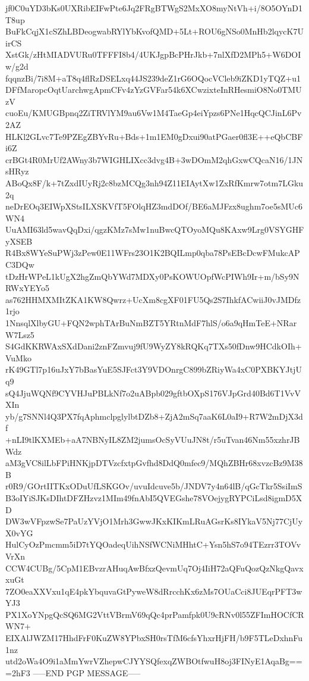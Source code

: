 jf0C0uYD3bKs0UXRibEIFwPte6Jq2FRgBTWgS2MxXO8myNtVh+i/8O5OYnD1T8up
BuFkCqjX1cSZhLBDeogwabRYlYbKvofQMD+5Lt+ROU6gNSo0MnHb2lqycK7UirCS
XstGk/zHtMIADVURu0TFFFI8b4/4UKJgpBcPHrJkb+7nlXfD2MPh5+W6DOIw/g2d
fqqnzBi/7i8M+aT8q4flRzDSELxq44JS239deZ1rG6OQocVCleb9iZKD1yTQZ+u1
DFfMaropcOqtUarchwgApmCFv4zYzGVFar54k6XCwzixteInRHesmiO8No0TMUzV
cuoEu/KMUGBpnq2ZiTRVlYM9au6Vw1M4TaeGp4eiYpzs6PNe1HqcQCJinL6Pv2AZ
HLKl2GLvc7Te9PZEgZBYvRu+Bds+1m1EM0gDxui90atPGaer0fl3E++eQbCBFi6Z
crBGt4R0MrUf2AWny3b7WIGHLIXcc3dvg4B+3wDOmM2qhGxwCQcaN16/1JNsHRyz
ABoQx8F/k+7tZxdIUyRj2c8bzMCQg3nh94Z11EIAytXw1ZxRfKmrw7otm7LGku2q
neDrEOq3EIWpXStsILXSKVfT5FOlqHZ3mdDOf/BE6aMJFzx8ughm7oe5sMUc6WN4
UuAMI63ld5wavQqDxi/qgzKMz7sMw1nuBwcQTOyoMQu8KAxw9Lrg0VSYGHFyXSEB
R4Bx8WYeSuPWj3zPew0E11WFrs23O1K2BQILmp0qba78PsEBcDcwFMukcAPC3DQw
tDzHrWPeL1kUgX2hgZmQbYWd7MDXy0PsKOWUOpfWcPIWh9Ir+m/bSy9NRWxYEYo5
as762HHMXMItZKA1KW8Qwrz+UcXm8cgXF01FU5Qs2S7IhkfACwiiJ0vJMDfz1rjo
1NnsqlXlbyGU+FQN2wphTArBuNmBZT5YRtnMdF7hlS/o6a9qHmTeE+NRarW7Lsz5
S4GdKKRWAxSXdDani2znFZmvuj9fU9WyZY8kRQKq7TXs50fDnw9HCdkOIh+VuMko
rK49GTl7p16uJxY7bBasYuE5SJFct3Y9VDOnrgC899bZRiyWa4xC0PXBKYJtjUq9
sQ4JjuWQNf9CYVHJuPBLkNf7o2uABpb029gftbOXpS176VJpGrd40Bd6T1VvVXIn
yb/g7SNNl4Q3PX7fqAphmclpglylbtDZb8+ZjA2mSq7aaK6L0aI9+R7W2mDjX3df
+nLI9tlKXMEb+aA7NBNyIL8ZM2jumsOcSyVUuJN8t/r5uTvan46Nm55xzhrJBWdz
aM3gVC8ilLbFPiHNKjpDTVzcfxtpGvfhd8DdQ0mfec9/MQhZBHr68xvzcBz9M38B
r0R9/GOrtIITKxODuUfLSKGOv/uvuIdcuve5b/JNDV7y4n64lB/qGcTkr5SsiImS
B3oIYiSJKsDIhtDFZHzvz1MIm49fnAbI5QVEGshe78VOejygRYPCiLsd8igmD5XD
DW3wVFpzwSe7PaUzYVjO1Mrh3GwwJKxKIKmLRuAGsrKs8IYkaV5Nj77CjUyX0vYG
HulCyOzPmcmm5iD7tYQOadeqUihNSfWCNiMHhtC+Ysn5hS7o94TEzrr3TOVvVrXn
CCW4CUBg/5CpM1EBvzrAHuqAwBfxzQevmUq7Oj4IiH72aQFuQozQzNkgQavxxuGt
7ZO0eaXXVxu1qE4pkYbquvaGtPyweW8dRrcchKx6zMs7OUaCci8JUEqrPFT3wYJ3
PX1XoYNpgQcSQ6MG2VttVBrmV69qQc4prPamfpk0U9cRNv0l55ZFImHOCfCRWN7+
EIXAlJWZM17HhdFrF0KuZW8YPbxSH0rsTfM6cfsYhxrHjFH/b9F5TLeDxhnFu1nz
utd2oWa4O9i1aMmYwrVZhepwCJYYSQfexqZWBOtfwuH8oj3FINyE1AqaBg==
=2hF3
-----END PGP MESSAGE-----
